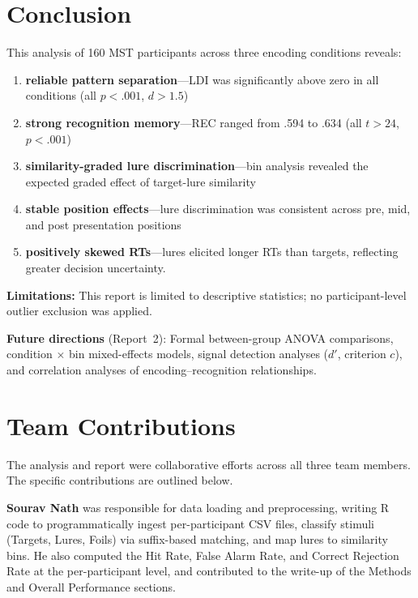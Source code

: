 \documentclass[12pt]{article}
\begin{document}
\section{Conclusion}

This analysis of 160 MST participants across three encoding conditions reveals: 
\begin{enumerate}
    \item \textbf{reliable pattern separation}---LDI was significantly above zero in all conditions (all $p < .001$, $d > 1.5$)
    \item \textbf{strong recognition memory}---REC ranged from .594 to .634 (all $t > 24$, $p < .001$)
    \item \textbf{similarity-graded lure discrimination}---bin analysis revealed the expected graded effect of target-lure similarity
    \item \textbf{stable position effects}---lure discrimination was consistent across pre, mid, and post presentation positions
    \item \textbf{positively skewed RTs}---lures elicited longer RTs than targets, reflecting greater decision uncertainty.
\end{enumerate}
\textbf{Limitations:} This report is limited to descriptive statistics; no participant-level outlier exclusion was applied. 

\textbf{Future directions} (Report~2): Formal between-group ANOVA comparisons, condition $\times$ bin mixed-effects models, signal detection analyses ($d'$, criterion $c$), and correlation analyses of encoding--recognition relationships.

\section{Team Contributions}

The analysis and report were collaborative efforts across all three team members. The specific contributions are outlined below.

\textbf{Sourav Nath} was responsible for data loading and preprocessing, writing R code to programmatically ingest per-participant CSV files, classify stimuli (Targets, Lures, Foils) via suffix-based matching, and map lures to similarity bins. He also computed the Hit Rate, False Alarm Rate, and Correct Rejection Rate at the per-participant level, and contributed to the write-up of the Methods and Overall Performance sections.
\end{document}
